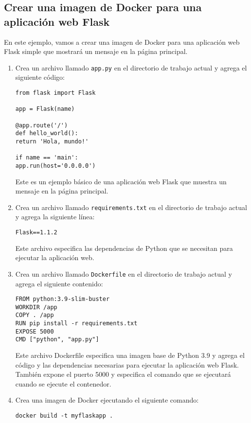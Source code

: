 \documentclass{article}
\begin{document}
\subsection{Crear una imagen de Docker para una aplicación web Flask}
En este ejemplo, vamos a crear una imagen de Docker para una aplicación web Flask simple que mostrará un mensaje en la página principal.

\begin{enumerate}
    \item Crea un archivo llamado \lstinline{app.py} en el directorio de trabajo actual y agrega el siguiente código:

          \begin{lstlisting}[numbers=none]
from flask import Flask

app = Flask(name)

@app.route('/')
def hello_world():
return 'Hola, mundo!'

if name == 'main':
app.run(host='0.0.0.0')
\end{lstlisting}

          Este es un ejemplo básico de una aplicación web Flask que muestra un mensaje en la página principal.
    \item Crea un archivo llamado \lstinline{requirements.txt} en el directorio de trabajo actual y agrega la siguiente línea:
          \begin{lstlisting}[numbers=none]
Flask==1.1.2
\end{lstlisting}

          Este archivo especifica las dependencias de Python que se necesitan para ejecutar la aplicación web.
    \item Crea un archivo llamado \lstinline{Dockerfile} en el directorio de trabajo actual y agrega el siguiente contenido:

          \begin{lstlisting}[numbers=none]
FROM python:3.9-slim-buster
WORKDIR /app
COPY . /app
RUN pip install -r requirements.txt
EXPOSE 5000
CMD ["python", "app.py"]
\end{lstlisting}

          Este archivo Dockerfile especifica una imagen base de Python 3.9 y agrega el código y las dependencias necesarias para ejecutar la aplicación web Flask. También expone el puerto 5000 y especifica el comando que se ejecutará cuando se ejecute el contenedor.

    \item Crea una imagen de Docker ejecutando el siguiente comando:
          \begin{lstlisting}[numbers=none]
docker build -t myflaskapp .
\end{lstlisting}


\end{enumerate}
\end{document}
